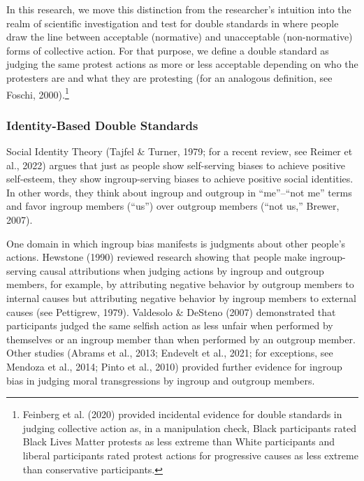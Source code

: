 \documentclass[12pt, letterpaper]{article}
\begin{document}
In this research, we move this distinction from the researcher's
intuition into the realm of scientific investigation and test for double
standards in where people draw the line between acceptable (normative)
and unacceptable (non-normative) forms of collective action. For that
purpose, we define a double standard as judging the same protest actions
as more or less acceptable depending on who the protesters are and what
they are protesting (for an analogous definition, see Foschi,
2000).\footnote{Feinberg et al. (2020) provided incidental evidence for
  double standards in judging collective action as, in a manipulation
  check, Black participants rated Black Lives Matter protests as less
  extreme than White participants and liberal participants rated protest
  actions for progressive causes as less extreme than conservative
  participants.}

\hypertarget{identity-based-double-standards}{%
\subsubsection{Identity-Based Double
Standards}\label{identity-based-double-standards}}

Social Identity Theory (Tajfel \& Turner, 1979; for a recent review, see
Reimer et al., 2022) argues that just as people show self-serving biases
to achieve positive self-esteem, they show ingroup-serving biases to
achieve positive social identities. In other words, they think about
ingroup and outgroup in ``me''--``not me'' terms and favor ingroup
members (``us'') over outgroup members (``not us,'' Brewer, 2007).

One domain in which ingroup bias manifests is judgments about other
people's actions. Hewstone (1990) reviewed research showing that people
make ingroup-serving causal attributions when judging actions by ingroup
and outgroup members, for example, by attributing negative behavior by
outgroup members to internal causes but attributing negative behavior by
ingroup members to external causes (see Pettigrew, 1979). Valdesolo \&
DeSteno (2007) demonstrated that participants judged the same selfish
action as less unfair when performed by themselves or an ingroup member
than when performed by an outgroup member. Other studies (Abrams et al.,
2013; Endevelt et al., 2021; for exceptions, see Mendoza et al., 2014;
Pinto et al., 2010) provided further evidence for ingroup bias in
judging moral transgressions by ingroup and outgroup members.
\end{document}
